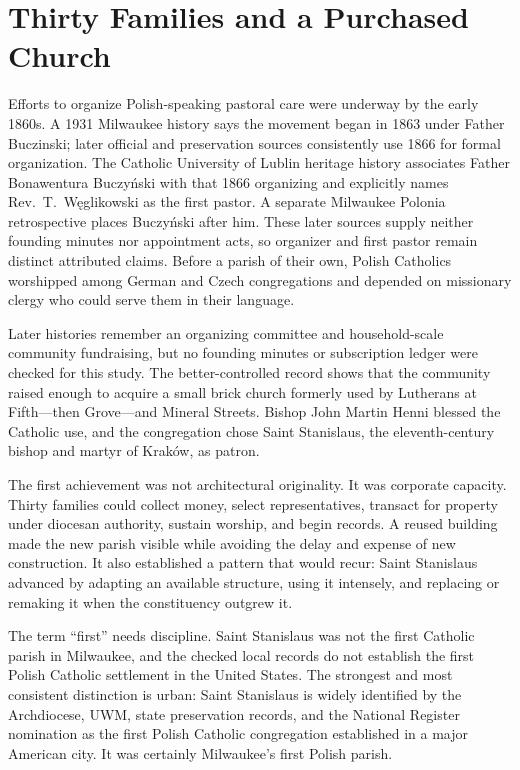\section{Thirty Families and a Purchased Church}

Efforts to organize Polish-speaking pastoral care were underway by the early 1860s. A 1931 Milwaukee history says the movement began in 1863 under Father Buczinski; later official and preservation sources consistently use 1866 for formal organization. The Catholic University of Lublin heritage history associates Father Bonawentura Buczy\'nski with that 1866 organizing and explicitly names Rev.~T.~W\k{e}glikowski as the first pastor. A separate Milwaukee Polonia retrospective places Buczy\'nski after him. These later sources supply neither founding minutes nor appointment acts, so organizer and first pastor remain distinct attributed claims. Before a parish of their own, Polish Catholics worshipped among German and Czech congregations and depended on missionary clergy who could serve them in their language.

Later histories remember an organizing committee and household-scale community fundraising, but no founding minutes or subscription ledger were checked for this study. The better-controlled record shows that the community raised enough to acquire a small brick church formerly used by Lutherans at Fifth---then Grove---and Mineral Streets. Bishop John Martin Henni blessed the Catholic use, and the congregation chose Saint Stanislaus, the eleventh-century bishop and martyr of Kraków, as patron.

The first achievement was not architectural originality. It was corporate capacity. Thirty families could collect money, select representatives, transact for property under diocesan authority, sustain worship, and begin records. A reused building made the new parish visible while avoiding the delay and expense of new construction. It also established a pattern that would recur: Saint Stanislaus advanced by adapting an available structure, using it intensely, and replacing or remaking it when the constituency outgrew it.

The term ``first'' needs discipline. Saint Stanislaus was not the first Catholic parish in Milwaukee, and the checked local records do not establish the first Polish Catholic settlement in the United States. The strongest and most consistent distinction is urban: Saint Stanislaus is widely identified by the Archdiocese, UWM, state preservation records, and the National Register nomination as the first Polish Catholic congregation established in a major American city. It was certainly Milwaukee's first Polish parish.

